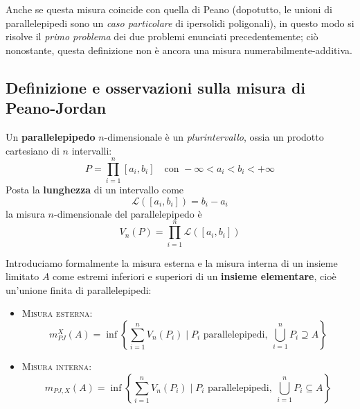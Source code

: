 Anche se questa misura coincide con quella di Peano (dopotutto, le unioni di parallelepipedi sono un \textit{caso particolare} di ipersolidi poligonali), in questo modo si risolve il \textit{primo problema} dei due problemi enunciati precedentemente; ciò nonostante, questa definizione non è ancora una misura numerabilmente-additiva.
\subsection{Definizione e osservazioni sulla misura di Peano-Jordan}
\begin{define}
	Un \textbf{parallelepipedo} $n$-dimensionale è un \textit{plurintervallo}, ossia un prodotto cartesiano di $n$ intervalli:
	\begin{equation}
		P=\prod_{i=1}^{n}\left[a_i,b_i\right]\quad\text{con }-\infty < a_i < b_i < +\infty
	\end{equation}
	Posta la \textbf{lunghezza} di un intervallo come
		\begin{equation}
			\mathcal{L}\left(\left[a_i,b_i\right]\right)=b_i-a_i
		\end{equation}
		la misura $n$-dimensionale del parallelepipedo è
		\begin{equation}
			V_n\left(P\right)=\prod_{i=1}^{n}\mathcal{L}\left(\left[a_i,b_i\right]\right)
		\end{equation}
	\end{define}
	Introduciamo formalmente la misura esterna e la misura interna di un insieme limitato $A$ come estremi inferiori e superiori di un \textbf{insieme elementare}, cioè un'unione finita di parallelepipedi:
	\begin{itemize}
		\item \textsc{Misura esterna}: \begin{equation}
			m_{PJ}^X\left(A\right)=\inf\left\{\sum_{i=1}^{n}V_n\left(P_i\right)\mid P_i\text{ parallelepipedi},\ \bigcup_{i=1}^nP_i\supseteq A\right\}
		\end{equation}
		\item \textsc{Misura interna}:
		\begin{equation}
			m_{PJ,X}\left(A\right)=\inf\left\{\sum_{i=1}^{n}V_n\left(P_i\right)\mid P_i\text{ parallelepipedi},\ \bigcup_{i=1}^nP_i\subseteq A\right\}
		\end{equation}
	\end{itemize}

